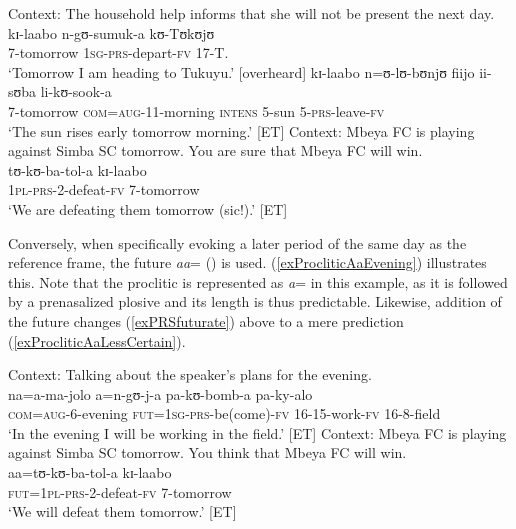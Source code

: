 \begin{exe}
\ex \label{exPRSplanned} Context: The household help informs that she will not be present the next day.\\
\gll kɪ-laabo n-gʊ-sumuk-a kʊ-Tʊkʊjʊ\\
7-tomorrow \textsc{1sg}-\textsc{prs}-depart-\textsc{fv} 17-T.\\
\glt `Tomorrow I am heading to Tukuyu.' [overheard]
\ex \label{exPRSscheduled} \gll kɪ-laabo n=ʊ-lʊ-bʊnjʊ fiijo ii-sʊba li-kʊ-sook-a\\
7-tomorrow \textsc{com}=\textsc{aug}-11-morning \textsc{intens} 5-sun 5-\textsc{prs}-leave-\textsc{fv}\\
\glt `The sun rises early tomorrow morning.' [ET]
\ex \label{exPRSfuturate}
Context: Mbeya FC is playing against Simba SC tomorrow. You are sure that Mbeya FC will win.\\
\gll tʊ-kʊ-ba-tol-a kɪ-laabo\\
\textsc{1pl}-\textsc{prs}-2-defeat-\textsc{fv} 7-tomorrow\\
\glt \lq We are defeating them tomorrow (sic!).' [ET]
\end{exe}

Conversely, when specifically evoking a later period of the same day as the reference frame, the future  \textit{aa}= () is used. (\ref{exProcliticAaEvening}) illustrates this. Note that the proclitic is represented as \textit{a}= in this example, as it is followed by a prenasalized plosive and its length is thus predictable. Likewise, addition of the future  changes (\ref{exPRSfuturate}) above to a mere prediction (\ref{exProcliticAaLessCertain}).
\begin{exe}
\ex \label{exProcliticAaEvening}
Context: Talking about the speaker's plans for the evening.\\
\gll na=a-ma-jolo a=n-gʊ-j-a pa-kʊ-bomb-a pa-ky-alo\\
\textsc{com}=\textsc{aug}-6-evening \textsc{fut}=\textsc{1sg}-\textsc{prs}-be(come)-\textsc{fv} 16-15-work-\textsc{fv} 16-8-field\\
\glt `In the evening I will be working in the field.' [ET]
\ex \label{exProcliticAaLessCertain}
Context: Mbeya FC is playing against Simba SC tomorrow. You think that Mbeya FC will win.\\
\gll aa=tʊ-kʊ-ba-tol-a kɪ-laabo\\
\textsc{fut}=\textsc{1pl}-\textsc{prs}-2-defeat-\textsc{fv} 7-tomorrow\\
\glt \lq We will defeat them tomorrow.' [ET]
\end{exe}

